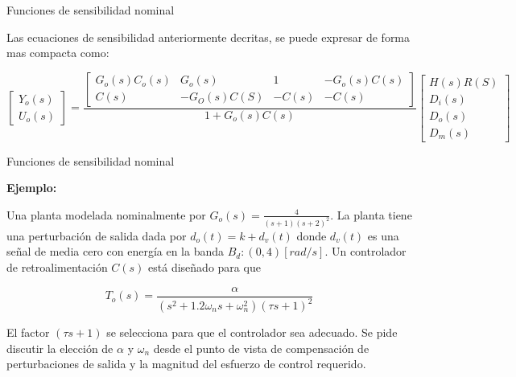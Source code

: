 \documentclass{beamer}
\begin{document}
\begin{frame}{Funciones de sensibilidad nominal}
\justifying
{\small
\vspace{0.1 cm}
Las ecuaciones de sensibilidad anteriormente decritas, se puede expresar de forma mas compacta como:
\vspace{0.1 cm}

}
{\footnotesize
\begin{equation}\label{ecuacioncompacta} %
\begin{bmatrix}
Y_o(s) \\
U_o(s)
\end{bmatrix}
=
\frac{\begin{bmatrix}
G_o(s)C_o(s) & G_o(s) & 1 & -G_o(s)C(s) \\
C(s) & -G_O(s)C(S) & -C(s) & -C(s) 
\end{bmatrix}}{1 + G_o(s)C(s)}
\begin{bmatrix}
H(s)R(S) \\
D_i(s) \\
D_o(s) \\
D_m(s)
\end{bmatrix}
\end{equation}
}
\end{frame}

\begin{frame}{Funciones de sensibilidad nominal}
\begin{justify}
\textbf{Ejemplo:}

\vspace{0.3cm}
Una planta modelada nominalmente por $G_o(s) = \frac{4}{(s+1)(s+2)^2}$. La planta tiene una perturbación de salida dada por $d_o(t) = k + d_v(t)$ donde $d_v(t)$  es una señal de media cero con energía en la banda $B_d: (0,4)[rad/s]$.
Un controlador de retroalimentación $C(s)$ está diseñado para que

\vspace{0.3 cm}
\begin{equation}
    T_o(s) = \frac{\alpha}{(s^2+1.2\omega_ns + \omega_n^2)(\tau s + 1)^2}
\end{equation}

\vspace{0.3 cm}
El factor $(\tau s + 1)$ se selecciona para que el controlador sea adecuado. Se pide discutir la elección de $\alpha$ y $\omega_n$ desde el punto de vista de compensación de perturbaciones de salida y la magnitud del esfuerzo de control requerido.

\end{justify}
\end{frame}
\end{document}
